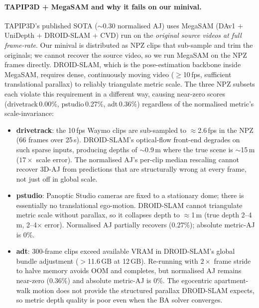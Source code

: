 \documentclass[11pt,a4paper]{article}
\begin{document}
\paragraph{TAPIP3D + MegaSAM and why it fails on our minival.}
\label{sec:megasam-fail}
TAPIP3D's published SOTA ($\sim$0.30 normalised AJ) uses MegaSAM (DAv1 $+$ UniDepth $+$ DROID-SLAM $+$ CVD)
run on the \emph{original source videos at full frame-rate}.
Our minival is distributed as NPZ clips that sub-sample and trim the originals; we cannot recover the
source video, so we run MegaSAM on the NPZ frames directly.
DROID-SLAM, which is the pose-estimation backbone inside MegaSAM, requires dense, continuously
moving video ($\geq$10\,fps, sufficient translational parallax) to reliably triangulate metric scale.
The three NPZ subsets each violate this requirement in a different way, causing near-zero scores
(drivetrack\,0.00\%, pstudio\,0.27\%, adt\,0.36\%) regardless of the normalised metric's scale-invariance:

\begin{itemize}
\item \textbf{drivetrack}: the 10\,fps Waymo clips are sub-sampled to $\approx$2.6\,fps in the NPZ
  (66 frames over 25\,s). DROID-SLAM's optical-flow front-end degrades on such sparse inputs,
  producing depths of $\sim$0.9\,m where the true scene is $\sim$15\,m ($17\times$ scale error).
  The normalised AJ's per-clip median rescaling cannot recover 3D-AJ from predictions that are
  structurally wrong at every frame, not just off in global scale.

\item \textbf{pstudio}: Panoptic Studio cameras are fixed to a stationary dome; there is essentially
  no translational ego-motion. DROID-SLAM cannot triangulate metric scale without parallax, so it
  collapses depth to $\approx$1\,m (true depth 2--4\,m, 2--4$\times$ error). Normalised AJ
  partially recovers (0.27\%); absolute metric-AJ is 0\%.

\item \textbf{adt}: 300-frame clips exceed available VRAM in DROID-SLAM's global bundle adjustment
  ($>$11.6\,GB at 12\,GB). Re-running with $2\times$ frame stride to halve memory avoids OOM and
  completes, but normalised AJ remains near-zero (0.36\%) and absolute metric-AJ is 0\%.
  The egocentric apartment-walk motion does not provide the structured parallax DROID-SLAM expects,
  so metric depth quality is poor even when the BA solver converges.
\end{itemize}
\end{document}
